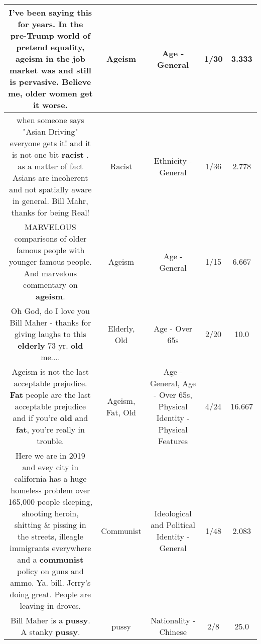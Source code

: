 \documentclass[11pt]{article}
\newlength\mylength
\begin{document}
\begin{center}
\begin{longtable}{|C{.65\mylength}|C{.30\mylength}|C{.12\mylength}|C{.12\mylength}|C{.12\mylength}|}
  \small I've been saying this for years. In the pre-Trump world of pretend equality, \textbf{ageism} in the job market was and still is pervasive. Believe me, older women get it worse.\normalsize   & Ageism & Age - General & 1/30 & 3.333 \\  \hline
  \small when someone says "Asian Driving" everyone gets it! and it is not one bit \textbf{racist} . as a matter of fact Asians are incoherent and not spatially aware in general. Bill Mahr, thanks for being Real!\normalsize   & Racist & Ethnicity - General & 1/36 & 2.778 \\  \hline
  \small MARVELOUS comparisons of older famous people with younger famous people. And marvelous commentary on \textbf{ageism}.\normalsize   & Ageism & Age - General & 1/15 & 6.667 \\  \hline
  \small Oh God, do I love you Bill Maher - thanks for giving laughs to this \textbf{elderly} 73 yr. \textbf{old} me....\normalsize   & Elderly, Old & Age - Over 65s & 2/20 & 10.0 \\  \hline
  \small Ageism is not the last acceptable prejudice. \textbf{Fat} people are the last acceptable prejudice and if you're \textbf{old} and \textbf{fat}, you're really in trouble.\normalsize   & Ageism, Fat, Old & Age - General, Age - Over 65s, Physical Identity - Physical Features & 4/24 & 16.667 \\  \hline
  \small Here we are in 2019 and evey city in california has a huge homeless problem over 165,000 people sleeping, shooting heroin, shitting \& pissing in the streets, illeagle immigrants everywhere and a \textbf{communist} policy on guns and ammo. Ya. bill. Jerry's doing great. People are leaving in droves.\normalsize   & Communist &  Ideological and Political Identity - General & 1/48 & 2.083 \\  \hline
  \small Bill Maher is a \textbf{pussy}.  A stanky \textbf{pussy}.\normalsize   & pussy & Nationality - Chinese & 2/8 & 25.0 \\  \hline

\end{longtable}
\end{center}
\end{document}
